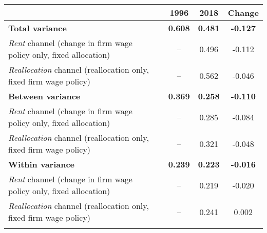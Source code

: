 \begin{tabular}{l c c c c } 
\hline \hline \addlinespace[1.5ex] 
&& 1996 & 2018 & Change \\ \hline \addlinespace[1.5ex] 
\textbf{Total variance} && \textbf{0.608} & \textbf{0.481} & \textbf{-0.127} \\ 
\hspace{.05in} \textit{Rent} channel (change in firm wage policy only, fixed allocation) && -- & 0.496 & -0.112 \\ 
\hspace{.05in} \textit{Reallocation} channel (reallocation only, fixed firm wage policy) && -- & 0.562 & -0.046 \\ 
\addlinespace[1.5ex] 
\textbf{Between variance} && \textbf{0.369} & \textbf{0.258} & \textbf{-0.110} \\ 
\hspace{.05in} \textit{Rent} channel (change in firm wage policy only, fixed allocation) && -- & 0.285 & -0.084 \\ 
\hspace{.05in} \textit{Reallocation} channel (reallocation only, fixed firm wage policy) && -- & 0.321 & -0.048 \\ 
\addlinespace[1.5ex] 
\textbf{Within variance} && \textbf{0.239} & \textbf{0.223} & \textbf{-0.016} \\ 
\hspace{.05in} \textit{Rent} channel (change in firm wage policy only, fixed allocation) && -- & 0.219 & -0.020 \\ 
\hspace{.05in} \textit{Reallocation} channel (reallocation only, fixed firm wage policy) && -- & 0.241 & 0.002 \\ 
\addlinespace[1.5ex] 
\hline 
\end{tabular}